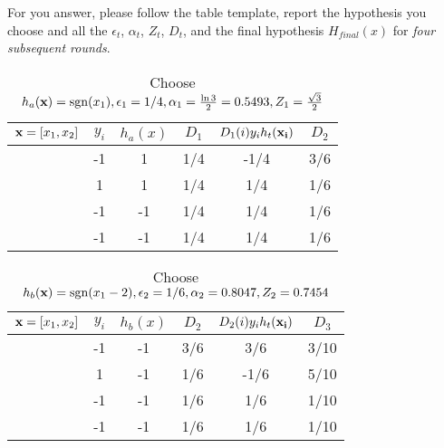 For you answer, please follow the table template, report the
hypothesis you choose and all the $\epsilon_t$, $\alpha_t$, $Z_t$,
$D_t$, and the final hypothesis $H_{final}(x)$ for {\em four
  subsequent rounds}.
\begin{table}[H]
  \centering
  \caption{Choose $h_a({\bf x}) = \operatorname{sgn}(x_1), \epsilon_1 = 1/4, \alpha_1 = \frac{\ln3}{2} =0.5493, Z_1 = \frac{\sqrt{3}}{2}$}
  \label{tab:Ada1}
  \begin{tabular}{|c|c|c|c|c|c|}
    \hline
    ${\bf x} = [x_1,x_2]$ & $y_i$ & $h_a(x)$ & $D_1$ & $D_{1}(i)y_{i}h_t({\bf x_i})$ & $D_2$ \\ \hline
    [1,1]          &     -1  & 1    & 1/4   & -1/4                          &  3/6     \\ \hline
    [1,-1]         &    1   & 1    & 1/4   & 1/4                           &    1/6   \\ \hline
    [-1,-1]        &     -1  & -1    & 1/4   & 1/4                           & 1/6      \\ \hline
    [-1,1]         &     -1 & -1    & 1/4   & 1/4                           &  1/6     \\ \hline
  \end{tabular}
\end{table}

\begin{table}[H]
  \centering
  \caption{Choose $h_b({\bf x}) = \operatorname{sgn}(x_1 - 2), \epsilon_2 = 1/6, \alpha_2 = 0.8047, Z_2 = 0.7454$}
  \label{tab:Ada1}
  \begin{tabular}{|c|c|c|c|c|c|}
    \hline
    ${\bf x} = [x_1,x_2]$ & $y_i$ & $h_b(x)$ & $D_2$ & $D_{2}(i)y_{i}h_t({\bf x_i})$ & $D_3$ \\ \hline
    [1,1]          &     -1  & -1    & 3/6   & 3/6                          &  3/10     \\ \hline
    [1,-1]         &    1   & -1    & 1/6   & -1/6                          &    5/10   \\ \hline
    [-1,-1]        &     -1  & -1    & 1/6   & 1/6                           & 1/10      \\ \hline
    [-1,1]         &     -1 & -1    & 1/6   & 1/6                           &  1/10     \\ \hline
  \end{tabular}
\end{table}


